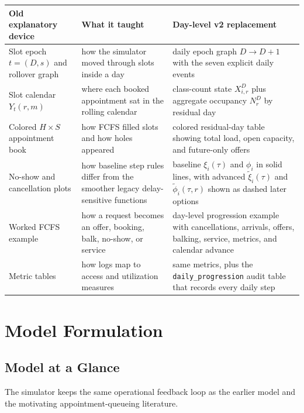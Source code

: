 \documentclass[11pt]{article}
\begin{document}
\begin{center}
\small
\begin{tabular}{L{0.28\textwidth} L{0.28\textwidth} L{0.34\textwidth}}
\toprule
\textbf{Old explanatory device} & \textbf{What it taught} & \textbf{Day-level v2 replacement} \\
\midrule
Slot epoch \(t=(D,s)\) and rollover graph & how the simulator moved through slots inside a day & daily epoch graph \(D\to D+1\) with the seven explicit daily events \\
\addlinespace
Slot calendar \(Y_t(r,m)\) & where each booked appointment sat in the rolling calendar & class-count state \(X_{i,r}^{D}\) plus aggregate occupancy \(N_r^D\) by residual day \\
\addlinespace
Colored \(H\times S\) appointment book & how FCFS filled slots and how holes appeared & colored residual-day table showing total load, open capacity, and future-only offers \\
\addlinespace
No-show and cancellation plots & how baseline step rules differ from the smoother legacy delay-sensitive functions & baseline \(\xi_i(\tau)\) and \(\phi_i\) in solid lines, with advanced \(\tilde{\xi}_i(\tau)\) and \(\tilde{\phi}_i(\tau,r)\) shown as dashed later options \\
\addlinespace
Worked FCFS example & how a request becomes an offer, booking, balk, no-show, or service & day-level progression example with cancellations, arrivals, offers, balking, service, metrics, and calendar advance \\
\addlinespace
Metric tables & how logs map to access and utilization measures & same metrics, plus the \texttt{daily\_progression} audit table that records every daily step \\
\bottomrule
\end{tabular}
\normalsize
\end{center}

\section{Model Formulation}

\subsection{Model at a Glance}

The simulator keeps the same operational feedback loop as the earlier model and the motivating
appointment-queueing literature.
\end{document}
